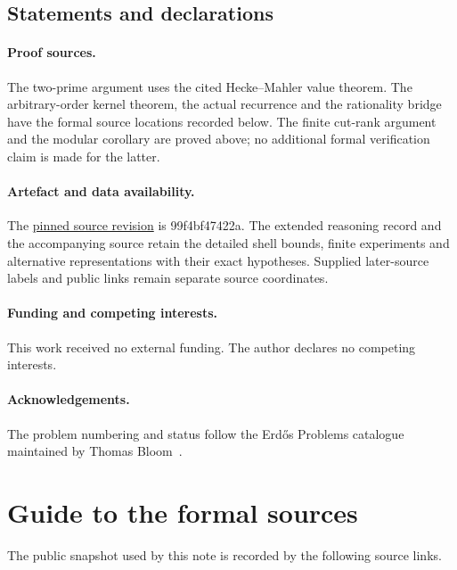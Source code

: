\documentclass[11pt]{article}
\renewcommand{\commitshort}{99f4bf47422a}
\begin{document}
\subsection*{Statements and declarations}
\paragraph{Proof sources.}
The two-prime argument uses the cited Hecke--Mahler value theorem.
The arbitrary-order kernel theorem, the actual recurrence and the
rationality bridge have the formal source locations recorded below.
The finite cut-rank argument and the modular corollary are proved above;
no additional formal verification claim is made for the latter.

\paragraph{Artefact and data availability.}
The \href{\sourceurl}{pinned source revision} is \commitshort.
The extended reasoning record and the accompanying source retain the
detailed shell bounds, finite experiments and alternative representations
with their exact hypotheses.  Supplied later-source labels and public links remain separate
source coordinates.

\paragraph{Funding and competing interests.} This work received no external
funding.  The author declares no competing interests.
\paragraph{Acknowledgements.} The problem numbering and status follow the
Erd\H{o}s Problems catalogue maintained by Thomas Bloom~\cite{erdosproblems}.

\appendix
\section{Guide to the formal sources}\label{app:sources}

The public snapshot used by this note is recorded by the following source links.
\end{document}
